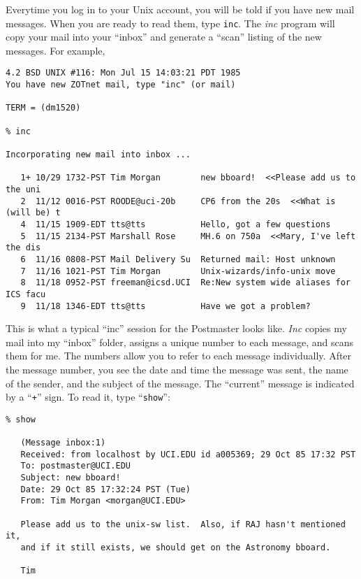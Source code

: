 Everytime you log in to your {\sc Unix} account, you will be told if you
have new mail messages.  When you are ready to read them, type \verb|inc|.
The {\it inc\/} program will copy your mail into your ``inbox'' and generate
a ``scan'' listing of the new messages. For example,

\begin{scriptsize}
\begin{verbatim}
4.2 BSD UNIX #116: Mon Jul 15 14:03:21 PDT 1985
You have new ZOTnet mail, type "inc" (or mail)

TERM = (dm1520)

% inc

Incorporating new mail into inbox ...
 
   1+ 10/29 1732-PST Tim Morgan        new bboard!  <<Please add us to the uni
   2  11/12 0016-PST ROODE@uci-20b     CP6 from the 20s  <<What is (will be) t
   4  11/15 1909-EDT tts@tts           Hello, got a few questions
   5  11/15 2134-PST Marshall Rose     MH.6 on 750a  <<Mary, I've left the dis
   6  11/16 0808-PST Mail Delivery Su  Returned mail: Host unknown
   7  11/16 1021-PST Tim Morgan        Unix-wizards/info-unix move
   8  11/18 0952-PST freeman@icsd.UCI  Re:New system wide aliases for ICS facu
   9  11/18 1346-EDT tts@tts           Have we got a problem?
\end{verbatim}
\end{scriptsize}

This is what a typical ``inc'' session for the Postmaster looks like.  
{\it Inc\/} copies my mail into my ``inbox'' folder, assigns a unique number to
each message, and scans them for me.  The numbers allow you to refer
to each message individually.  After the message number, you see the
date and time the message was sent, the name of the sender, and the
subject of the message. The ``current'' message is indicated by a 
``{\tt +}'' sign. To read it, type ``{\tt show}'':

\begin{scriptsize}
\begin{verbatim}
% show

   (Message inbox:1)
   Received: from localhost by UCI.EDU id a005369; 29 Oct 85 17:32 PST
   To: postmaster@UCI.EDU
   Subject: new bboard!
   Date: 29 Oct 85 17:32:24 PST (Tue)
   From: Tim Morgan <morgan@UCI.EDU>
   
   Please add us to the unix-sw list.  Also, if RAJ hasn't mentioned it,
   and if it still exists, we should get on the Astronomy bboard.

   Tim
\end{verbatim}
\end{scriptsize}

